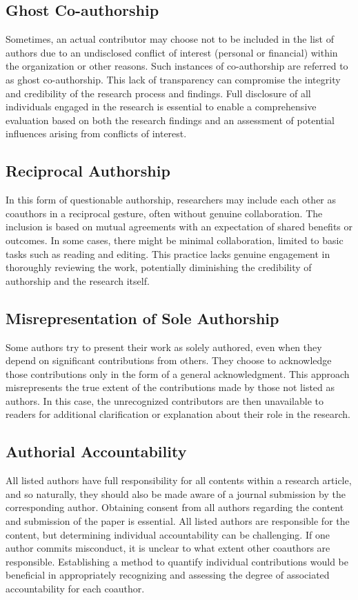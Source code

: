 \documentclass{article}
\begin{document}
	\subsection{Ghost Co-authorship}
	Sometimes, an actual contributor may choose not to be included in the list of authors due to an undisclosed
	conflict of interest (personal or financial) within the organization or other reasons.
	Such instances of co-authorship are referred to as ghost co-authorship.
	This lack of transparency can compromise the integrity and credibility of the research process and findings.
	Full disclosure of all individuals engaged in the research is essential to enable a comprehensive
	evaluation based on both the research findings and an assessment of potential influences arising from
	conflicts of interest.

	\subsection{Reciprocal Authorship}
	In this form of questionable authorship, researchers may include each other as coauthors in a reciprocal
	gesture, often without genuine collaboration.
	The inclusion is based on mutual agreements with an expectation of shared benefits or outcomes.
	In some cases, there might be minimal collaboration, limited to basic tasks such as reading and editing.
	This practice lacks genuine engagement in thoroughly reviewing the work, potentially diminishing the
	credibility of authorship and the research itself.

	\subsection{Misrepresentation of Sole Authorship}
	Some authors try to present their work as solely authored, even when they depend on significant
	contributions from others.
	They choose to acknowledge those contributions only in the form of a general acknowledgment.
	This approach misrepresents the true extent of the contributions made by those not listed as authors.
	In this case, the unrecognized contributors are then unavailable to readers for additional clarification or
	explanation about their role in the research.

	\subsection{Authorial Accountability}
	All listed authors have full responsibility for all contents within a research article, and so naturally,
	they should also be made aware of a journal submission by the corresponding author.
	Obtaining consent from all authors regarding the content and submission of the paper is essential.
	All listed authors are responsible for the content, but determining individual accountability can be
	challenging.
	If one author commits misconduct, it is unclear to what extent other coauthors are responsible.
	Establishing a method to quantify individual contributions would be beneficial in appropriately recognizing
	and assessing the degree of associated accountability for each coauthor.
\end{document}
